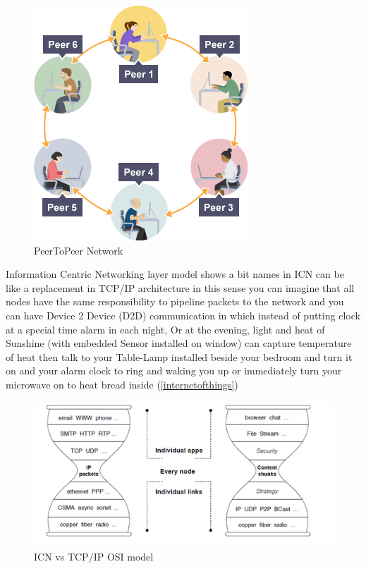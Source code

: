 \begin{figure}[H]

\begin{center}

\includegraphics[scale = 0.4]{Pictures/peertopeer.png}

\caption{PeerToPeer Network} \label{peertopeer} 

\end{center}

\end{figure}



Information Centric Networking layer model shows a bit names in ICN can be like a replacement in TCP/IP architecture in this sense you can imagine that all nodes have the same responsibility to pipeline packets to the network and you can have Device 2 Device (D2D) communication in which instead of putting clock at a special time alarm in each night, Or at the evening, light and heat of Sunshine (with embedded Sensor installed on window) can capture temperature of heat then talk to your Table-Lamp installed beside your bedroom and turn it on and your alarm clock to ring and waking you up or immediately turn your microwave on to heat bread inside (\ref{internetofthings})



\begin{figure}[H]

\begin{center}

\includegraphics[scale = 0.6]{Pictures/spec.png}

\caption{ICN vs TCP/IP OSI model} \label{spec} 

\end{center}

\end{figure}

